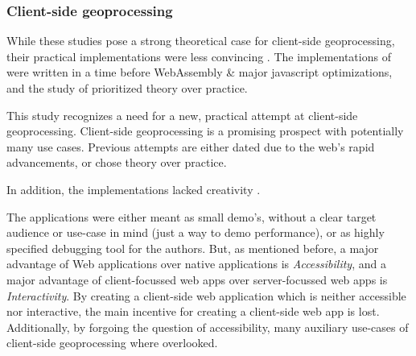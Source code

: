 
\subsubsection*{Client-side geoprocessing}


While these studies pose a strong theoretical case for client-side geoprocessing, their practical implementations were less convincing . 
The implementations of \cite{panidi_hybrid_2015, hamilton_client-side_2014} were written in a time before WebAssembly \& major javascript optimizations, and the study of \cite{kulawiak_analysis_2019} prioritized theory over practice. 


This study recognizes a need for a new, practical attempt at client-side geoprocessing. 
Client-side geoprocessing is a promising prospect with potentially many use cases.
Previous attempts are either dated due to the web's rapid advancements, or chose theory over practice.

In addition, the implementations lacked creativity . 

The applications were either meant as small demo's, without a clear target audience or use-case in mind (just a way to demo performance), or as highly specified debugging tool for the authors.   
But, as mentioned before, a major advantage of Web applications over native applications is \emph{Accessibility}, and a major advantage of client-focussed web apps over server-focussed web apps is \emph{Interactivity}. 
By creating a client-side web application which is neither accessible nor interactive, the main incentive for creating a client-side web app is lost.
Additionally, by forgoing the question of accessibility, many auxiliary use-cases of client-side geoprocessing where overlooked.


